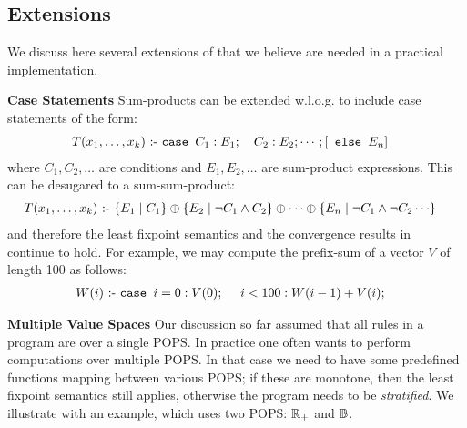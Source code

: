 \subsection{Extensions}

\label{subsec:extensions:datalogo}

We discuss here several extensions of \datalogo that we believe are
needed in a practical implementation.

{\bf Case Statements} Sum-products can be extended w.l.o.g. to include
case statements of the form:
\begin{align*}
  T(x_1, \ldots, x_k) &\text{ :- } \texttt{case } C_1: E_1; \ \ \ C_2: E_2;\cdots; [\texttt{ else } E_n]
\end{align*}
%
where $C_1, C_2, \ldots$ are conditions and $E_1, E_2, \ldots$ are
sum-product expressions.  This can be desugared to a sum-sum-product:
%
\begin{align*}
  T(x_1, \ldots, x_k) &\text{ :- } \{{E_1}\mid{C_1}\} \oplus \{{E_2}\mid{\neg C_1 \wedge C_2}\} \oplus\cdots \oplus \{{E_n}\mid{\neg C_1 \wedge \neg C_2 \cdots}\}
\end{align*}
%
and therefore the least fixpoint semantics and the convergence results
in~\cite{DBLP:conf/pods/Khamis0PSW22} continue to hold.
%
For example, we may compute the prefix-sum of a vector $V$ of length
100 as follows:
%
\begin{align*}
  W(i) &\text{ :- } \texttt{case } i=0: V(0);\ \ \ \ i<100: W(i-1) + V(i);
\end{align*}
%

{\bf Multiple Value Spaces} Our discussion so far assumed that all
rules in a \datalogo program are over a single POPS.  In practice one
often wants to perform computations over multiple POPS.  In that case
we need to have some predefined functions mapping between various
POPS; if these are monotone, then the least fixpoint semantics still
applies, otherwise the program needs to be {\em stratified}.  We
illustrate with an example, which uses two POPS: $\mathbb R_+$ and $\mathbb B$.

